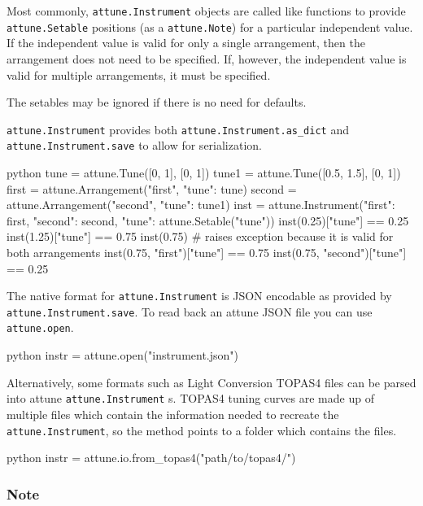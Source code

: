 Most commonly, \texttt{attune.Instrument} objects are
called like functions to provide
\texttt{attune.Setable} positions (as a
\texttt{attune.Note}) for a particular independent
value. If the independent value is valid for only a single arrangement,
then the arrangement does not need to be specified. If, however, the
independent value is valid for multiple arrangements, it must be
specified.

The setables may be ignored if there is no need for defaults.

\texttt{attune.Instrument} provides both
\texttt{attune.Instrument.as\_dict} and
\texttt{attune.Instrument.save} to allow for
serialization.

\begin{codefragment}{python}
tune = attune.Tune([0, 1], [0, 1])
tune1 = attune.Tune([0.5, 1.5], [0, 1])
first = attune.Arrangement("first", {"tune": tune})
second = attune.Arrangement("second", {"tune": tune1})
inst = attune.Instrument({"first": first, "second": second}, {"tune": attune.Setable("tune")})
inst(0.25)["tune"] == 0.25
inst(1.25)["tune"] == 0.75
inst(0.75) # raises exception because it is valid for both arrangements
inst(0.75, "first")["tune"] == 0.75
inst(0.75, "second")["tune"] == 0.25
\end{codefragment}

\hypertarget{loading-from-files}{%
\label{loading-from-files}}

The native format for \texttt{attune.Instrument} is
JSON encodable as provided by
\texttt{attune.Instrument.save}. To read back an attune
JSON file you can use \texttt{attune.open}.

\begin{codefragment}{python}
instr = attune.open("instrument.json")
\end{codefragment}

Alternatively, some formats such as Light Conversion TOPAS4 files can be
parsed into attune \texttt{attune.Instrument} s. TOPAS4
tuning curves are made up of multiple files which contain the
information needed to recreate the
\texttt{attune.Instrument}, so the method points to a
folder which contains the files.

\begin{codefragment}{python}
instr = attune.io.from_topas4("path/to/topas4/")
\end{codefragment}

\hypertarget{note}{%
\subsubsection{Note}\label{note}}

